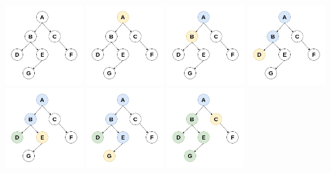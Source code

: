 \documentclass{article}
\begin{document}
\includegraphics[width=3cm]{1.jpg}
\includegraphics[width=3cm]{2.jpg}
\includegraphics[width=3cm]{3.jpg}
\includegraphics[width=3cm]{4.jpg}
\includegraphics[width=3cm]{5.jpg}
\includegraphics[width=3cm]{6.jpg}
\includegraphics[width=3cm]{7.jpg}
\end{document}
